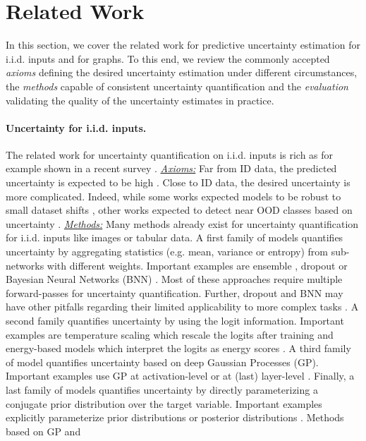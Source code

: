 \section{Related Work}
\label{sec:related_work_009}

In this section, we cover the related work for predictive uncertainty estimation for i.i.d. inputs and for graphs. To this end, we review the commonly accepted \emph{axioms} defining the desired uncertainty estimation under different circumstances, the \emph{methods} capable of consistent uncertainty quantification and the \emph{evaluation} validating the quality of the uncertainty estimates in practice.

\paragraph{Uncertainty for i.i.d. inputs.} The related work for uncertainty quantification on i.i.d. inputs is rich as for example shown in a recent survey \citep{Abdar2020}. \emph{\underline{Axioms:}} Far from ID data, the predicted uncertainty is expected to be high \citep{provable-uncertainty, NatPN2021, bayesian-a-bit, sufficient-conditions-no-adversarial}. Close to ID data, the desired uncertainty is more complicated. Indeed, while some works expected models to be robust to small dataset shifts \citep{Ovadia2019, confidence-calibrated-adversarial}, other works expected to detect near OOD classes based on uncertainty \citep{contrastive-ood, robustness-uncertainty-dirichlet, attack-detection}. \emph{\underline{Methods:}} Many methods already exist for uncertainty quantification for i.i.d. inputs like images or tabular data. A first family of models quantifies uncertainty by aggregating statistics (e.g. mean, variance or entropy) from sub-networks with different weights. Important examples are ensemble \citep{Lakshminarayanan2017, batch-ensembles, hyper-ensembles, mimo-independent-subnetworks}, dropout \citep{Srivastava2014} or Bayesian Neural Networks (BNN) \citep{blundell2015, Depeweg2018, simple-baseline-uncertainty, liberty-depth-bnn, rank-1-bnn}. Most of these approaches require multiple forward-passes for uncertainty quantification. Further, dropout and BNN may have other pitfalls regarding their limited applicability to more complex tasks \citep{Osband2016, Hron2018, Graves2011, Foong2019}. A second family quantifies uncertainty by using the logit information. Important examples are temperature scaling which rescale the logits after training \citep{Guo2017, Liang2017} and energy-based models which interpret the logits as energy scores \citep{Liu2020a, Grathwohl2019}. A third family of model quantifies uncertainty based on deep Gaussian Processes (GP). Important examples use GP at activation-level \cite{gp-uncertainty-activation} or at (last) layer-level \citep{uncertainty-distance-awareness, bayesian-a-bit, duq, Bilovs2019}. Finally, a last family of models quantifies uncertainty by directly parameterizing a conjugate prior distribution over the target variable. Important examples explicitly parameterize prior distributions \citep{sensoy2018, Malinin2019a, Malinin2018, Malinin2019b, evidential-regression} or posterior distributions \citep{charpentier2020, NatPN2021}. Methods based on GP and 